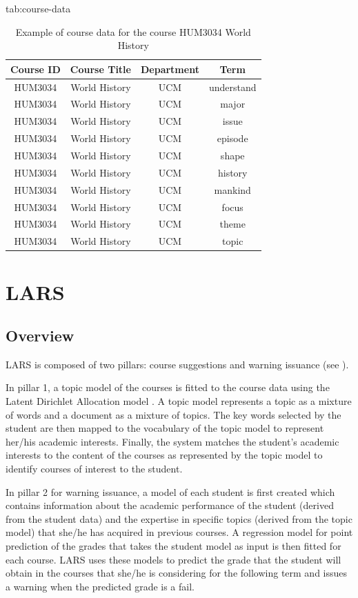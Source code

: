 \documentclass[pmlr]{jmlr}%
\begin{document}
\begin{table}[hbtp]
	\floatconts
	{tab:course-data}
	{\caption{Example of course data for the course HUM3034 World History}}	
	{\begin{tabular}{cccc}
			\toprule
			\bfseries Course ID &\bfseries Course Title &\bfseries Department &\bfseries Term\\
			\midrule
			HUM3034 & World History & UCM & understand\\
			HUM3034 & World History & UCM & major\\
			HUM3034 & World History & UCM & issue\\
			HUM3034 & World History & UCM & episode\\
			HUM3034 & World History & UCM & shape\\
			\addlinespace
			HUM3034 & World History & UCM & history\\
			HUM3034 & World History & UCM & mankind\\
			HUM3034 & World History & UCM & focus\\
			HUM3034 & World History & UCM & theme\\
			HUM3034 & World History & UCM & topic\\
			\bottomrule
	\end{tabular}}	
\end{table}

\section{LARS}
\label{sec:crs}
\subsection{Overview}
\label{sec:overview}

LARS is composed of two pillars: course suggestions and warning issuance (see ). 

In pillar 1, a topic model of the courses is fitted to the course data using the Latent Dirichlet Allocation model \citep{Blei.2003}. A topic model represents a topic as a mixture of words and a document as a mixture of topics. The key words selected by the student are then mapped to the vocabulary of the topic model to represent her/his academic interests. Finally, the system matches the student's academic interests to the content of the courses as represented by the topic model to identify courses of interest to the student.

In pillar 2 for warning issuance, a model of each student is first created which contains information about the academic performance of the student (derived from the student data) and the expertise in specific topics (derived from the topic model) that she/he has acquired in previous courses. A regression model for point prediction of the grades that takes the student model as input is then fitted for each course. LARS uses these models to predict the grade that the student will obtain in the courses that she/he is considering for the following term and issues a warning when the predicted grade is a fail.
\end{document}

